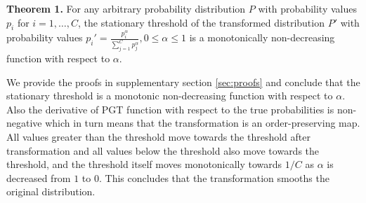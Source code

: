 \documentclass[runningheads]{llncs}
\begin{document}
\textbf{Theorem 1.} For any arbitrary probability distribution $P$ with probability
values $p_i$ for $i=1,\dots,C$, the stationary threshold of the transformed distribution
$P'$ with probability values $p_i'=\frac{p_i^{\alpha}}{\sum _{j=1}^C p_j^\alpha}, 0 \leq
\alpha \leq 1$ is a monotonically non-decreasing function with respect to $\alpha$.



We provide the proofs in supplementary section \ref{sec:proofs} and conclude that the
stationary threshold is a monotonic non-decreasing function with respect to $\alpha$.
Also the derivative of PGT function with respect to the true probabilities is
non-negative which in turn means that the transformation is an order-preserving map. All
values greater than the threshold move towards the threshold after transformation and
all values below the threshold also move towards the threshold, and the threshold itself
moves monotonically towards $1/C$ as $\alpha$ is decreased from $1$ to $0$. This
concludes that the transformation smooths the original distribution.
\end{document}

